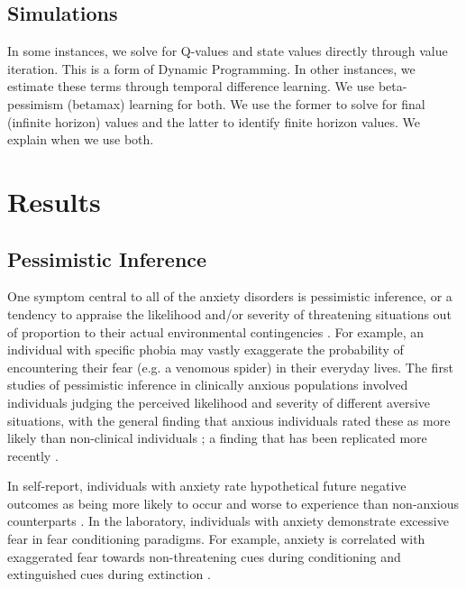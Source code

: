 \documentclass[11pt]{article} %
\begin{document}
\subsection{Simulations}

In some instances, we solve for Q-values and state values directly through value
iteration. This is a form of Dynamic Programming. In other instances, we estimate
these terms through temporal difference learning. We use beta-pessimism (betamax)
learning for both. We use the former to solve for final (infinite horizon) values
and the latter to identify finite horizon values. We explain when we use both.

\section{Results}

\subsection{Pessimistic Inference}

One symptom central to all of the anxiety disorders is pessimistic inference,
or a tendency to appraise the likelihood and/or severity of threatening situations
out of proportion to their actual environmental contingencies \citep{dsm5, BeckClark1997,
ClarkBeck2011}. For example, an individual with specific phobia may vastly exaggerate
the probability of encountering their fear (e.g. a venomous spider) in their
everyday lives. The first studies of pessimistic inference in clinically anxious
populations involved individuals judging the perceived likelihood and severity
of different aversive situations, with the general finding that anxious individuals
rated these as more likely than non-clinical individuals \citep{ButlerMathews1983,
ButlerMathews1987, Foa1996, MacLeod1996, MacLeod1997, Luten1997, Stober1997,
Borkovec1999}; a finding that has been replicated more recently \citep{Maner2006,
Mitte2007, Miranda2007}.

In self-report,
individuals with anxiety rate hypothetical future negative outcomes as
being more likely to occur and worse to experience than non-anxious counterparts
\citep{ButlerMathews1983, ButlerMathews1987, Foa1996, MacLeod1996, MacLeod1997,
Luten1997, Stober1997, Borkovec1999, Maner2006, Mitte2007, Miranda2007}. In the
laboratory, individuals with anxiety demonstrate excessive fear in fear conditioning
paradigms. For example, anxiety is correlated with exaggerated fear towards
non-threatening cues during conditioning and extinguished cues during extinction
\citep{lissek2005, Duits2015}.
\end{document}
